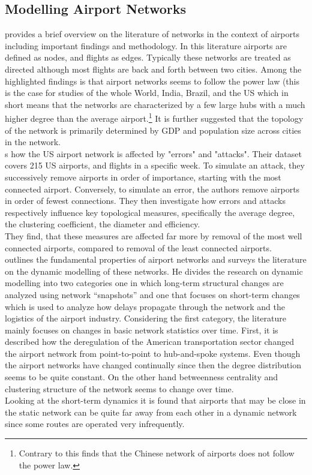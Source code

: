 \subsection{Modelling Airport Networks}
\citet[pp. 41-42]{costa2011analyzing} provides a brief overview on the literature of networks in the context of airports including important findings and methodology. In this literature airports are defined as nodes, and flights as edges. Typically these networks are treated as directed although most flights are back and forth between two cities. Among the highlighted findings is that airport networks seems to follow the power law (this is the case for studies of the whole World, India, Brazil, and the US which in short means that the networks are characterized by a few large hubs with a much higher degree than the average airport.\footnote{Contrary to this \citet{he2004statistics} finds that the Chinese network of airports does not follow the power law.} It is further suggested that the topology of the network is primarily determined by GDP and population size across cities in the network. \\
\citet{chi2004structural} s how the US airport network is affected by "errors" and "attacks". Their dataset covers 215 US airports, and flights in a specific week. To simulate an attack, they successively remove airports in order of importance, starting with the most connected airport. Conversely, to simulate an error, the authors remove airports in order of fewest connections. They then investigate how errors and attacks respectively influence key topological measures, specifically the average degree, the clustering coefficient, the diameter and efficiency. \\
They find, that these measures are affected far more by removal of the most well connected airports, compared to removal of the least connected airports. \\
\citet{rocha2017dynamics} outlines the fundamental properties of airport networks and surveys the literature on the dynamic modelling of these networks. He divides the research on dynamic modelling into two categories one in which long-term structural changes are analyzed using network ``snapshots'' and one that focuses on short-term changes which is used to analyze how delays propagate through the network and the logistics of the airport industry. Considering the first category, the literature mainly focuses on changes in basic network statistics over time. First, it is described how the deregulation of the American transportation sector changed the airport network from point-to-point to hub-and-spoke systems. Even though the airport networks have changed continually since then the degree distribution seems to be quite constant. On the other hand betweenness centrality and clustering structure of the network seems to change over time. \\
Looking at the short-term dynamics it is found that airports that may be close in the static network can be quite far away from each other in a dynamic network since some routes are operated very infrequently.  


 
